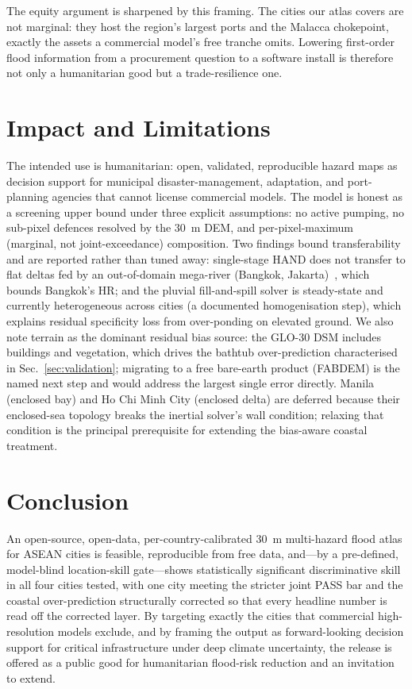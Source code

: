 \documentclass[conference]{IEEEtran}
\begin{document}
The equity argument is sharpened by this framing. The cities our atlas covers are not marginal: they host the region's largest ports and the Malacca chokepoint, exactly the assets a commercial model's free tranche omits. Lowering first-order flood information from a procurement question to a software install is therefore not only a humanitarian good but a trade-resilience one.

\section{Impact and Limitations}
\label{sec:impact}
The intended use is humanitarian: open, validated, reproducible hazard maps as decision support for municipal disaster-management, adaptation, and port-planning agencies that cannot license commercial models. The model is honest as a screening upper bound under three explicit assumptions: no active pumping, no sub-pixel defences resolved by the 30~m DEM, and per-pixel-maximum (marginal, not joint-exceedance) composition. Two findings bound transferability and are reported rather than tuned away: single-stage HAND does not transfer to flat deltas fed by an out-of-domain mega-river (Bangkok, Jakarta)~\cite{trinh2017}, which bounds Bangkok's HR; and the pluvial fill-and-spill solver is steady-state and currently heterogeneous across cities (a documented homogenisation step), which explains residual specificity loss from over-ponding on elevated ground. We also note terrain as the dominant residual bias source: the GLO-30 DSM includes buildings and vegetation, which drives the bathtub over-prediction characterised in Sec.~\ref{sec:validation}; migrating to a free bare-earth product (FABDEM) is the named next step and would address the largest single error directly. Manila (enclosed bay) and Ho Chi Minh City (enclosed delta) are deferred because their enclosed-sea topology breaks the inertial solver's wall condition; relaxing that condition is the principal prerequisite for extending the bias-aware coastal treatment.

\section{Conclusion}
An open-source, open-data, per-country-calibrated 30~m multi-hazard flood atlas for ASEAN cities is feasible, reproducible from free data, and---by a pre-defined, model-blind location-skill gate---shows statistically significant discriminative skill in all four cities tested, with one city meeting the stricter joint PASS bar and the coastal over-prediction structurally corrected so that every headline number is read off the corrected layer. By targeting exactly the cities that commercial high-resolution models exclude, and by framing the output as forward-looking decision support for critical infrastructure under deep climate uncertainty, the release is offered as a public good for humanitarian flood-risk reduction and an invitation to extend.
\end{document}
